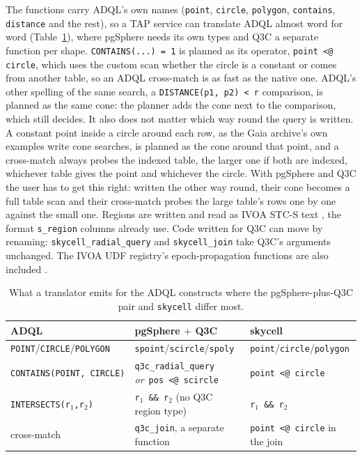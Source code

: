 \documentclass[final,5p,times,twocolumn,authoryear]{elsarticle}
\begin{document}
The functions carry ADQL's own names (\texttt{point}, \texttt{circle},
\texttt{polygon}, \texttt{contains}, \texttt{distance} and the rest), so a TAP service
can translate ADQL almost word for word (Table~\ref{tab:ops}), where pgSphere needs its
own types and Q3C a separate function per shape. \texttt{CONTAINS(...) = 1} is planned
as its operator, \texttt{point <@ circle}, which uses the
custom scan whether the circle is a constant or comes from another table, so an ADQL
cross-match is as fast as the native one. ADQL's other spelling of the same search, a
\texttt{DISTANCE(p1, p2) < r} comparison, is planned as the same cone: the planner adds
the cone next to the comparison, which still decides. It also does not matter which way round the
query is written. A constant point inside a circle around each row, as the Gaia
archive's own examples write cone searches, is planned as the cone around that point,
and a cross-match always probes the indexed table, the larger one if both are indexed,
whichever table gives the point and whichever the circle. With pgSphere and Q3C the
user has to get this right: written the other way round, their cone becomes a full
table scan and their cross-match probes the large table's rows one by one against the
small one. Regions are written and read as IVOA STC-S
text \citep{stc}, the format \texttt{s\_region} columns already use. Code written for
Q3C can move by renaming: \texttt{skycell\_radial\_query} and \texttt{skycell\_join}
take Q3C's arguments unchanged. The IVOA UDF registry's epoch-propagation functions are also
included \citep{hipparcos}.

\begin{table}
  \caption{What a translator emits for the ADQL constructs where the pgSphere-plus-Q3C
    pair and \texttt{skycell} differ most.}
  \label{tab:ops}
  \centering
  \footnotesize
  \begin{tabular}{@{}p{} p{} p{}@{}}
    \hline\hline
    ADQL & pgSphere $+$ Q3C & skycell \\
    \hline
    \texttt{POINT}\allowbreak/\allowbreak\texttt{CIRCLE}\allowbreak/\allowbreak\texttt{POLYGON} &
      \texttt{spoint}\allowbreak/\allowbreak\texttt{scircle}\allowbreak/\allowbreak\texttt{spoly} &
      \texttt{point}\allowbreak/\allowbreak\texttt{circle}\allowbreak/\allowbreak\texttt{polygon} \\[2pt]
    \texttt{CONTAINS(}\allowbreak\texttt{POINT,}\allowbreak\ \texttt{CIRCLE)} &
      \texttt{q3c\_radial\_query} \emph{or}\allowbreak\ \texttt{pos <@ scircle} &
      \texttt{point <@ circle} \\[2pt]
    \texttt{INTERSECTS(}\allowbreak\texttt{r$_1$,}\allowbreak\texttt{r$_2$)} &
      \texttt{r$_1$ \&\& r$_2$} (no Q3C region type) &
      \texttt{r$_1$ \&\& r$_2$} \\[2pt]
    cross-match &
      \texttt{q3c\_join}, a separate function &
      \texttt{point <@ circle} in the join \\[2pt]
    \hline
  \end{tabular}
\end{table}
\end{document}
